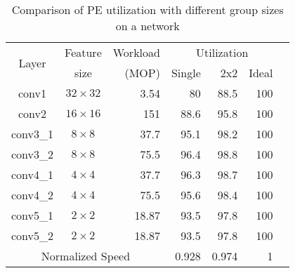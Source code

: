 \begin{table}[tb]
    \centering
    \caption{Comparison of PE utilization with different group sizes on a network}
      \begin{tabular}{|c|c|r|r|r|r|r|}
      \hline
      \multirow{2}[4]{*}{Layer} & Feature & Workload & \multicolumn{3}{c|}{Utilization} \\
  \cline{4-6}          & size & (MOP) & Single & 2x2 & Ideal\\
      \hline
      conv1 & $32\times 32$ & 3.54 & 80    & 88.5  & 100\\
      \hline
      conv2 & $16\times 16$ & 151 & 88.6  & 95.8  & 100\\
      \hline
      conv3\_1 & $8\times 8$   & 37.7 & 95.1  & 98.2  & 100\\
      \hline
      conv3\_2 & $8\times 8$   & 75.5 & 96.4  & 98.8  & 100\\
      \hline
      conv4\_1 & $4\times 4$   & 37.7 & 96.3  & 98.7  & 100\\
      \hline
      conv4\_2 & $4\times 4$   & 75.5 & 95.6  & 98.4  & 100\\
      \hline
      conv5\_1 & $2\times 2$   & 18.87 & 93.5  & 97.8  & 100\\
      \hline
      conv5\_2 & $2\times 2$   & 18.87 & 93.5  & 97.8  & 100\\
      \hline
      \multicolumn{3}{|c|}{Normalized Speed} & 0.928 & 0.974 & 1 \\
      \hline
      \end{tabular}
    \label{tab:hw_util}
  \end{table}